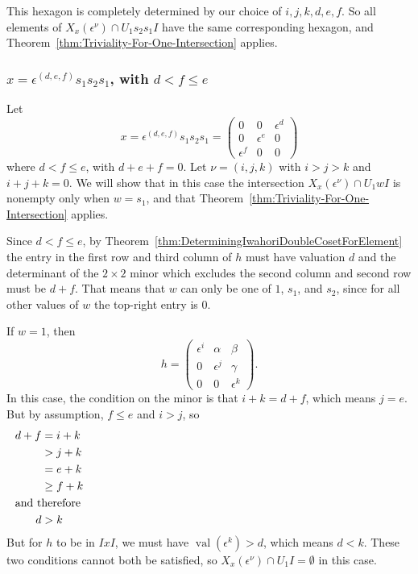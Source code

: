 \documentclass{amsart}
\theoremstyle{definition}
\def\e{\epsilon}
\def\val{\mathop{\mathrm{val}}}
\def\en{\e^{\nu}}
\def\X{X_x(\en)}
\begin{document}
  This hexagon is completely determined by our choice of $i,j,k,d,e,f$.  So all
  elements of $\X \cap U_1 s_2 s_1 I$ have the same corresponding hexagon, and
  Theorem~\ref{thm:Triviality-For-One-Intersection} applies.

  \subsubsection{$x = \e^{(d, e, f)}s_1 s_2 s_1$, with $d < f \le e$}

  Let
  \begin{equation}
    x = \e^{(d, e, f)}s_1 s_2 s_1 = \begin{pmatrix}
        0 & 0 & \e^d \\
        0 & \e^e & 0 \\
        \e^f & 0 & 0
      \end{pmatrix}
  \end{equation}
  where $d < f \le e$, with $d + e + f = 0$.  Let $\nu = (i,j,k)$ with $i > j >
  k$ and $i + j + k = 0$.  We will show that in this case the intersection $\X
  \cap U_1 wI$ is nonempty only when $w = s_1$, and that
  Theorem~\ref{thm:Triviality-For-One-Intersection} applies.

  Since $d < f \le e$, by
  Theorem~\ref{thm:DeterminingIwahoriDoubleCosetForElement} the entry in the
  first row and third column of $h$ must have valuation $d$ and the determinant
  of the $2 \times 2$ minor which excludes the second column and second row
  must be $d + f$.  That means that $w$ can only be one of $1$, $s_1$, and
  $s_2$, since for all other values of $w$ the top-right entry is 0.

  If $w = 1$, then
  \begin{equation*}
    h = \begin{pmatrix}
      \e^i & \alpha & \beta \\
      0 & \e^j & \gamma \\
      0 & 0 & \e^k
    \end{pmatrix}.
  \end{equation*}
  In this case, the condition on the minor is that $i + k = d + f$, which means
  $j = e$.  But by assumption, $f \le e$ and $i > j$, so
  \begin{align*}
    d + f &= i + k \\
          &> j + k \\
          &= e + k \\
          &\ge f + k \\
    \noalign{\noindent and therefore}
        d &> k
  \end{align*}
  But for $h$ to be in $IxI$, we must have $\val(\e^k) > d$, which means $d
  < k$.  These two conditions cannot both be satisfied, so $\X
  \cap U_1 I = \emptyset$ in this case.
\end{document}
